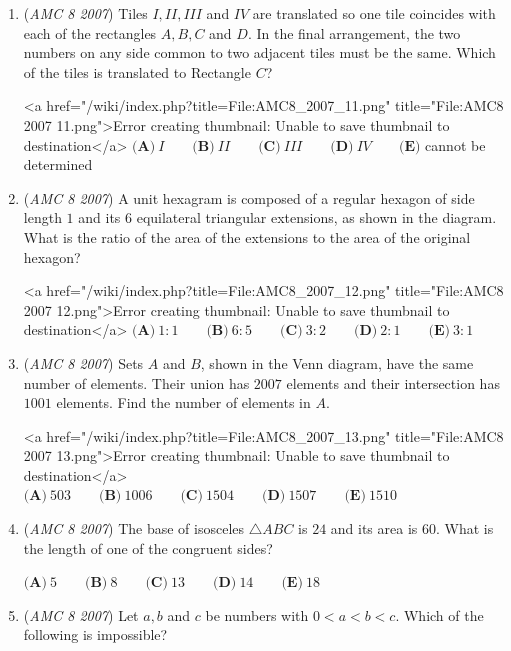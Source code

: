 \begin{enumerate}
 $\textbf{(A)}\ 13 \qquad \textbf{(B)}\ 20 \qquad \textbf{(C)}\ 24 \qquad \textbf{(D)}\ 28 \qquad \textbf{(E)}\ 30$


	\item (\textit{AMC 8 2007}) Tiles $I, II, III$ and $IV$ are translated so one tile coincides with each of the rectangles $A, B, C$ and $D$. In the final arrangement, the two numbers on any side common to two adjacent tiles must be the same. Which of the tiles is translated to Rectangle $C$?


 <a href="/wiki/index.php?title=File:AMC8\_2007\_11.png" title="File:AMC8 2007 11.png">Error creating thumbnail: Unable to save thumbnail to destination</a>
$\textbf{(A)}\ I \qquad \textbf{(B)}\ II \qquad \textbf{(C)}\ III \qquad \textbf{(D)}\ IV \qquad \textbf{(E)}$ cannot be determined


 

	\item (\textit{AMC 8 2007}) A unit hexagram is composed of a regular hexagon of side length $1$ and its $6$
equilateral triangular extensions, as shown in the diagram. What is the ratio of
the area of the extensions to the area of the original hexagon?


 <a href="/wiki/index.php?title=File:AMC8\_2007\_12.png" title="File:AMC8 2007 12.png">Error creating thumbnail: Unable to save thumbnail to destination</a>
$\textbf{(A)}\ 1:1 \qquad \textbf{(B)}\ 6:5  \qquad \textbf{(C)}\ 3:2 \qquad \textbf{(D)}\ 2:1 \qquad \textbf{(E)}\ 3:1$


	\item (\textit{AMC 8 2007}) Sets $A$ and $B$, shown in the Venn diagram, have the same number of elements.
Their union has $2007$ elements and their intersection has $1001$ elements. Find
the number of elements in $A$.


 <a href="/wiki/index.php?title=File:AMC8\_2007\_13.png" title="File:AMC8 2007 13.png">Error creating thumbnail: Unable to save thumbnail to destination</a>
$\textbf{(A)}\ 503 \qquad \textbf{(B)}\ 1006 \qquad \textbf{(C)}\ 1504 \qquad \textbf{(D)}\ 1507 \qquad \textbf{(E)}\ 1510$


	\item (\textit{AMC 8 2007}) The base of isosceles $\triangle ABC$ is $24$ and its area is $60$. What is the length of one
of the congruent sides?


 $\textbf{(A)}\ 5 \qquad \textbf{(B)}\ 8 \qquad \textbf{(C)}\ 13 \qquad \textbf{(D)}\ 14 \qquad \textbf{(E)}\ 18$


	\item (\textit{AMC 8 2007}) Let $a, b$ and $c$ be numbers with $0 < a < b < c$. Which of the following is
impossible?



\end{enumerate}

